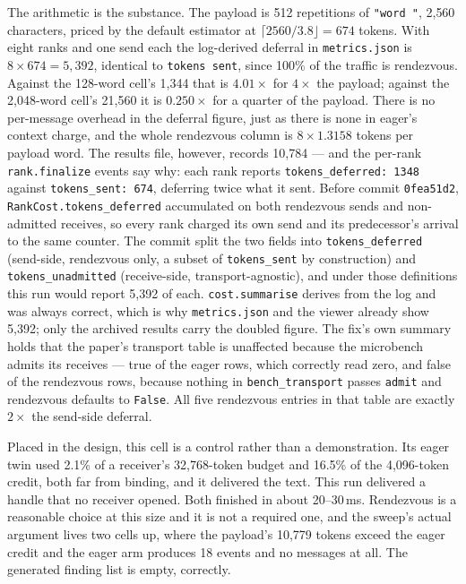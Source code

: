 \documentclass[11pt]{article}
\begin{document}
The arithmetic is the substance. The payload is 512 repetitions of \texttt{"word "},
2{,}560 characters, priced by the default estimator at
$\lceil 2560/3.8 \rfloor = 674$ tokens. With eight ranks and one send each the
log-derived deferral in \texttt{metrics.json} is $8 \times 674 = 5{,}392$, identical
to \texttt{tokens sent}, since 100\% of the traffic is rendezvous. Against the
128-word cell's 1{,}344 that is $4.01\times$ for $4\times$ the payload; against the
2{,}048-word cell's 21{,}560 it is $0.250\times$ for a quarter of the payload. There
is no per-message overhead in the deferral figure, just as there is none in eager's
context charge, and the whole rendezvous column is $8 \times 1.3158$ tokens per
payload word. The results file, however, records 10{,}784 --- and the per-rank
\texttt{rank.finalize} events say why: each rank reports \texttt{tokens\_deferred:
1348} against \texttt{tokens\_sent: 674}, deferring twice what it sent. Before commit
\texttt{0fea51d2}, \texttt{RankCost.tokens\_deferred} accumulated on both rendezvous
sends and non-admitted receives, so every rank charged its own send and its
predecessor's arrival to the same counter. The commit split the two fields into
\texttt{tokens\_deferred} (send-side, rendezvous only, a subset of
\texttt{tokens\_sent} by construction) and \texttt{tokens\_unadmitted} (receive-side,
transport-agnostic), and under those definitions this run would report 5{,}392 of
each. \texttt{cost.summarise} derives from the log and was always correct, which is
why \texttt{metrics.json} and the viewer already show 5{,}392; only the archived
results carry the doubled figure. The fix's own summary holds that the paper's
transport table is unaffected because the microbench admits its receives --- true of
the eager rows, which correctly read zero, and false of the rendezvous rows, because
nothing in \texttt{bench\_transport} passes \texttt{admit} and rendezvous defaults to
\texttt{False}. All five rendezvous entries in that table are exactly $2\times$ the
send-side deferral.

Placed in the design, this cell is a control rather than a demonstration. Its eager
twin used 2.1\% of a receiver's 32{,}768-token budget and 16.5\% of the 4{,}096-token
credit, both far from binding, and it delivered the text. This run delivered a handle
that no receiver opened. Both finished in about 20--30\,ms. Rendezvous is a
reasonable choice at this size and it is not a required one, and the sweep's actual
argument lives two cells up, where the payload's 10{,}779 tokens exceed the eager
credit and the eager arm produces 18 events and no messages at all. The generated
finding list is empty, correctly.
\end{document}

